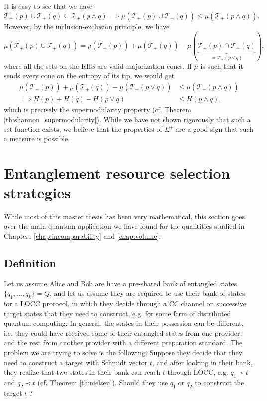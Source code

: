It is easy to see that we have
\begin{equation}
    \mathcal{T}_+(p) \cup \mathcal{T}_+(q) \subseteq \mathcal{T}_+(p \wedge q) \implies \mu\left(\mathcal{T}_+(p) \cup \mathcal{T}_+(q)\right) \leq \mu\left(\mathcal{T}_+(p \wedge q)\right).
\end{equation}
\noindent However, by the inclusion-exclusion principle, we have 
\begin{equation}
    \mu\left(\mathcal{T}_+(p) \cup \mathcal{T}_+(q)\right) = \mu\left(\mathcal{T}_+(p)\right) + \mu\left(\mathcal{T}_+(q)\right) - \mu\left(\underbrace{\mathcal{T}_+(p) \cap \mathcal{T}_+(q)}_{= \mathcal{T}_+(p \vee q)}\right),
\end{equation}
\noindent where all the sets on the RHS are valid majorization cones. If $\mu$ is such that it sends every cone on the entropy of its tip, we would get
\begin{align}
    \mu\left(\mathcal{T}_+(p)\right) + \mu\left(\mathcal{T}_+(q)\right) - \mu\left(\mathcal{T}_+(p \vee q)\right) &\leq \mu\left(\mathcal{T}_+(p \wedge q)\right)\\
    \implies H(p) + H(q) - H(p \vee q) &\leq H(p \wedge q),
\end{align}
\noindent which is precisely the supermodularity property (cf. Theorem \ref{th:shannon_supermodularity}). While we have not shown rigorously that such a set function exists, we believe that the properties of $E^+$ are a good sign that such a measure is possible.



\section{Entanglement resource selection strategies} \label{sec:strategies}

While most of this master thesis has been very mathematical, this section goes over the main quantum application we have found for the quantities studied in Chapters \ref{chap:incomparability} and \ref{chap:volume}.



\subsection{Definition}

Let us assume Alice and Bob are have a pre-shared bank of entangled states $\{q_1, \dots, q_k\} = Q$, and let us assume they are required to use their bank of states for a LOCC protocol, in which they decide through a CC channel on successive target states that they need to construct, e.g. for some form of distributed quantum computing. In general, the states in their possession can be different, i.e. they could have received some of their entangled states from one provider, and the rest from another provider with a different preparation standard. The problem we are trying to solve is the following. Suppose they decide that they need to construct a target with Schmidt vector $t$, and after looking in their bank, they realize that two states in their bank can reach $t$ through LOCC, e.g. $q_1 \prec t$ and $q_2 \prec t$ (cf. Theorem \ref{th:nielsen}). Should they use $q_1$ or $q_2$ to construct the target $t$ ?

